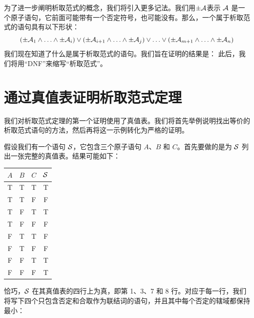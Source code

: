 为了进一步阐明析取范式的概念，我们将引入更多记法。我们用$\pm\mathcal{A}$表示 $\mathcal{A}$ 是一个原子语句，它前面可能带有一个否定符号，也可能没有。那么，一个属于析取范式的语句具有以下形状：
	$$(\pm \mathcal{A}_1 \land \ldots \land \pm \mathcal{A}_i) \lor (\pm \mathcal{A}_{i+1} \land \ldots \land \pm\mathcal{A}_j) \lor \ldots \lor (\pm\mathcal{A}_{m+1} \land \ldots \land \pm \mathcal{A}_n)$$
我们现在知道了什么是属于析取范式的语句。我们旨在证明的结果是：
此后，我们将用“DNF”来缩写“析取范式”。

\section{通过真值表证明析取范式定理}
\label{s:DNFTruthTable}

我们对析取范式定理的第一个证明使用了真值表。我们将首先举例说明找出等价的析取范式语句的方法，然后再将这一示例转化为严格的证明。

假设我们有一个语句 $\mathcal{S}$，它包含三个原子语句 $A$、$B$ 和 $C$。首先要做的是为 $\mathcal{S}$ 列出一张完整的真值表。结果可能如下：


\begin{center}
\begin{tabular}{c c c | c}
$A$ & $B$ & $C$ & $\mathcal{S}$\\
\hline
 T & T & T & T \\
 T & T & F & F \\
 T & F & T & T \\
 T & F & F & F \\
 F & T & T & F \\
 F & T & F & F \\
 F & F & T & T \\
 F & F & F & T
\end{tabular}
\end{center}


%
%
恰巧，$\mathcal{S}$ 在其真值表的四行上为真，即第 1、3、7 和 8 行。对应于每一行，我们将写下四个只包含否定和合取作为联结词的语句，并且其中每个否定的辖域都保持最小：


